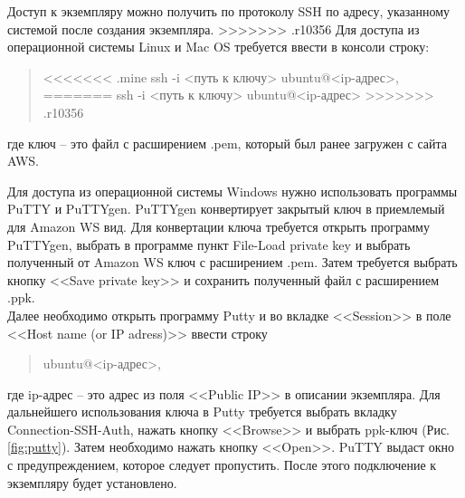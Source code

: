 \documentclass[12pt,twoside]{article}
\begin{document}
Доступ к экземпляру можно получить по протоколу SSH по адресу, указанному системой после создания экземпляра. 
>>>>>>> .r10356
Для доступа из операционной системы Linux и Mac OS требуется ввести в консоли строку:
\begin{quote}
<<<<<<< .mine
ssh -i <путь к ключу> ubuntu@<ip-адрес>,
=======
ssh -i <путь к ключу> ubuntu@<ip-адрес>
>>>>>>> .r10356
\end{quote}
где ключ -- это файл с расширением .pem, который был ранее загружен с сайта AWS.

Для доступа из операционной системы Windows нужно использовать программы PuTTY и PuTTYgen. PuTTYgen конвертирует закрытый ключ в приемлемый для Amazon WS вид. Для конвертации ключа требуется открыть программу PuTTYgen, выбрать в программе пункт File-Load private key и выбрать полученный от Amazon WS ключ с расширением .pem. Затем требуется выбрать кнопку <<Save private key>> и сохранить полученный файл с расширением .ppk. \\
Далее необходимо открыть программу Putty и во вкладке <<Session>> в поле <<Host name (or IP adress)>> ввести строку 
\begin{quote}
ubuntu@<ip-адрес>,
\end{quote}
где ip-адрес -- это адрес из поля <<Public IP>> в описании экземпляра. Для дальнейшего использования ключа в Putty требуется выбрать вкладку Connection-SSH-Auth, нажать кнопку <<Browse>> и выбрать ppk-ключ (Рис.\ref{fig:putty}). Затем необходимо нажать кнопку <<Open>>. PuTTY выдаст окно с предупреждением, которое следует пропустить. После этого подключение к экземпляру будет установлено.
\end{document}
